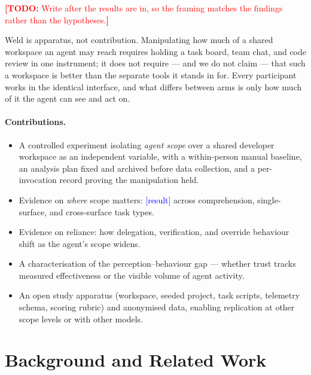 \documentclass[acmsmall,review,screen]{acmart}
\newcommand{\todo}[1]{\textcolor{red}{\textbf{[TODO:} #1\textbf{]}}}
\newcommand{\NUM}[1]{\textcolor{blue}{[#1]}}          %
\begin{document}
\todo{Write after the results are in, so the framing matches the findings
rather than the hypotheses.}

Weld is apparatus, not contribution. Manipulating how much of a shared workspace
an agent may reach requires holding a task board, team chat, and code review in
one instrument; it does not require --- and we do not claim --- that such a
workspace is better than the separate tools it stands in for. Every participant
works in the identical interface, and what differs between arms is only how much
of it the agent can see and act on.

\paragraph{Contributions.}
\begin{itemize}
  \item A controlled experiment isolating \emph{agent scope} over a shared
        developer workspace as an independent variable, with a within-person
        manual baseline, an analysis plan fixed and archived before data
        collection, and a per-invocation record proving the manipulation held.
  \item Evidence on \emph{where} scope matters: \NUM{result} across
        comprehension, single-surface, and cross-surface task types.
  \item Evidence on reliance: how delegation, verification, and override
        behaviour shift as the agent's scope widens.
  \item A characterisation of the perception--behaviour gap --- whether trust
        tracks measured effectiveness or the visible volume of agent activity.
  \item An open study apparatus (workspace, seeded project, task scripts,
        telemetry schema, scoring rubric) and anonymised data, enabling
        replication at other scope levels or with other models.
\end{itemize}

\section{Background and Related Work}
\end{document}
